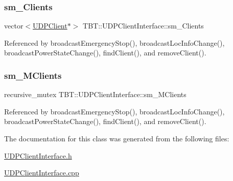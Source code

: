 \mbox{\label{classTBT_1_1UDPClientInterface_aeda0ecc87606d12d0de088344b2b31cc_aeda0ecc87606d12d0de088344b2b31cc}} 
\subsubsection{\texorpdfstring{sm\+\_\+\+Clients}{sm\_Clients}}
{\footnotesize\ttfamily vector$<$\hyperlink{classTBT_1_1UDPClient}{U\+D\+P\+Client}$\ast$$>$ T\+B\+T\+::\+U\+D\+P\+Client\+Interface\+::sm\+\_\+\+Clients\hspace{0.3cm}{\ttfamily [private]}}



Referenced by broadcast\+Emergency\+Stop(), broadcast\+Loc\+Info\+Change(), broadcast\+Power\+State\+Change(), find\+Client(), and remove\+Client().

\mbox{\label{classTBT_1_1UDPClientInterface_a8aa85fe79ea5527845988eed7d8758ab_a8aa85fe79ea5527845988eed7d8758ab}} 
\subsubsection{\texorpdfstring{sm\+\_\+\+M\+Clients}{sm\_MClients}}
{\footnotesize\ttfamily recursive\+\_\+mutex T\+B\+T\+::\+U\+D\+P\+Client\+Interface\+::sm\+\_\+\+M\+Clients\hspace{0.3cm}{\ttfamily [private]}}



Referenced by broadcast\+Emergency\+Stop(), broadcast\+Loc\+Info\+Change(), broadcast\+Power\+State\+Change(), find\+Client(), and remove\+Client().



The documentation for this class was generated from the following files\+:\begin{DoxyCompactItemize}
\item 
\hyperlink{UDPClientInterface_8h}{U\+D\+P\+Client\+Interface.\+h}\item 
\hyperlink{UDPClientInterface_8cpp}{U\+D\+P\+Client\+Interface.\+cpp}\end{DoxyCompactItemize}
